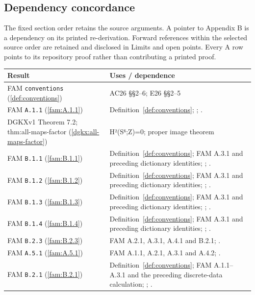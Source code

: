 \documentclass[11pt,a4paper]{article}
\theoremstyle{plain}
\theoremstyle{definition}
\begin{document}
\subsection{Dependency concordance}\label{app:dependencies}
The fixed section order retains the source arguments. A pointer to Appendix B is a dependency on its printed re-derivation. Forward references within the selected source order are retained and disclosed in Limits and open points. Every A row points to its repository proof rather than contributing a printed proof.
\begingroup\small\begin{longtable}{@{}L{.21\linewidth}L{.73\linewidth}@{}}
\toprule Result & Uses / dependence\\\midrule\endhead
FAM \nolinkurl{conventions} (\ref{def:conventions}) & AC26 §§2--6; E26 §§2--5\\
FAM \nolinkurl{A.1.1} (\ref{fam:A.1.1}) & Definition~\ref{def:conventions}; \cite[Theorem 7.1]{DGKXv1}; \cite[Theorem 9.1]{AC26}.\\
DGKXv1 Theorem 7.2; thm:\allowbreak{}all-maps-factor (\ref{dgkx:all-maps-factor}) & H²(S⁶;Z)=0; proper image theorem\\
FAM \nolinkurl{B.1.1} (\ref{fam:B.1.1}) & Definition~\ref{def:conventions}; FAM A.3.1 and preceding dictionary identities; \cite[Remark 3.12]{AC26}; \cite[Lemma 2.1; Corollary 2.2; Definition 2.3]{E26}.\\
FAM \nolinkurl{B.1.2} (\ref{fam:B.1.2}) & Definition~\ref{def:conventions}; FAM A.3.1 and preceding dictionary identities; \cite[Remark 3.12]{AC26}; \cite[Lemma 2.1; Corollary 2.2; Definition 2.3]{E26}.\\
FAM \nolinkurl{B.1.3} (\ref{fam:B.1.3}) & Definition~\ref{def:conventions}; FAM A.3.1 and preceding dictionary identities; \cite[Remark 3.12]{AC26}; \cite[Lemma 2.1; Corollary 2.2; Definition 2.3]{E26}.\\
FAM \nolinkurl{B.1.4} (\ref{fam:B.1.4}) & Definition~\ref{def:conventions}; FAM A.3.1 and preceding dictionary identities; \cite[Remark 3.12]{AC26}; \cite[Lemma 2.1; Corollary 2.2; Definition 2.3]{E26}.\\
FAM \nolinkurl{B.2.3} (\ref{fam:B.2.3}) & FAM A.2.1, A.3.1, A.4.1 and B.2.1; \cite[Remark 8.1]{E26}.\\
FAM \nolinkurl{A.5.1} (\ref{fam:A.5.1}) & FAM A.1.1, A.2.1, A.3.1 and A.4.2; \cite[Theorems 1.3, 1.4 and 7.1; punctured-disc corollary]{DGKXv1}.\\
FAM \nolinkurl{B.2.1} (\ref{fam:B.2.1}) & Definition~\ref{def:conventions}; FAM A.1.1--A.3.1 and the preceding discrete-data calculation; \cite[Section 6.4]{AC26}; \cite[Sections 3 and 5]{E26}.\\

\end{longtable}
\end{document}
